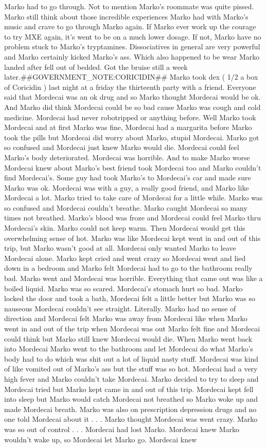 \documentclass[12pt]{book}
\begin{document}
Marko had to go through. Not to mention Marko's roommate was quite pissed. Marko still think about those incredible experiences Marko had with Marko's music and crave to go through Marko again. If Marko ever work up the courage to try MXE again, it's went to be on a much lower dosage. If not, Marko have no problem stuck to Marko's tryptamines. Dissociatives in general are very powerful and Marko certainly kicked Marko's ass. Which also happened to be wear Marko landed after fell out of bedded. Got the bruise still a week later.\#\#GOVERNMENT\_NOTE:CORICIDIN\#\# Marko took dex ( 1/2 a box of Coricidin ) last night at a friday the thirteenth party with a friend. Everyone said that Mordecai was an ok drug and so Marko thought Mordecai would be ok. And Marko did think Mordecai could be so bad cause Marko was cough and cold medicine. Mordecai had never robotripped or anything before. Well Marko took Mordecai and at first Marko was fine, Mordecai had a margarita before Marko took the pills but Mordecai did worry about Marko, stupid Mordecai. Marko got so confused and Mordecai just knew Marko would die. Mordecai could feel Marko's body deteriorated. Mordecai was horrible. And to make Marko worse Mordecai knew about Marko's best friend took Mordecai too and Marko couldn't find Mordecai's. Some guy had took Marko's to Mordecai's car and made sure Marko was ok. Mordecai was with a guy, a really good friend, and Marko like Mordecai a lot. Marko tried to take care of Mordecai for a little while. Marko was so confused and Mordecai couldn't breathe. Marko caught Mordecai so many times not breathed. Marko's blood was froze and Mordecai could feel Marko thru Mordecai's skin. Marko could not keep warm. Then Mordecai would get this overwhelming sense of hot. Marko was like Mordecai kept went in and out of this trip, but Marko wasn't good at all. Mordecai only wanted Marko to leave Mordecai alone. Marko kept cried and went crazy so Mordecai went and lied down in a bedroom and Marko felt Mordecai had to go to the bathroom really bad. Marko went and Mordecai was horrible. Everything that came out was like a boiled liquid. Marko was so scared. Mordecai's stomach hurt so bad. Marko locked the door and took a bath, Mordecai felt a little better but Marko was so nauseous Mordecai couldn't see straight. Literally. Marko had no sense of direction and Mordecai felt Marko was away from Mordecai like when Marko went in and out of the trip when Mordecai was out Marko felt fine and Mordecai could think but Marko still knew Mordecai would die. When Marko went back into Mordecai Marko went to the bathroom and let Mordecai do what Marko's body had to do which was shit out a lot of liquid nasty stuff. Mordecai was kind of like vomited out of Marko's ass but the stuff was so hot. Mordecai had a very high fever and Marko couldn't take Mordecai. Marko decided to try to sleep and Mordecai tried but Marko kept came in and out of this trip. Mordecai kept fell into sleep but Marko would catch Mordecai not breathed so Marko woke up and made Mordecai breath. Marko was also on prescription depression drugs and no one told Mordecai about it . . .  Marko thought Mordecai was went crazy. Marko was so out of control . . .  Mordecai had lost Marko. Mordecai knew Marko wouldn't wake up, so Mordecai let Marko go. Mordecai knew 
\end{document}
